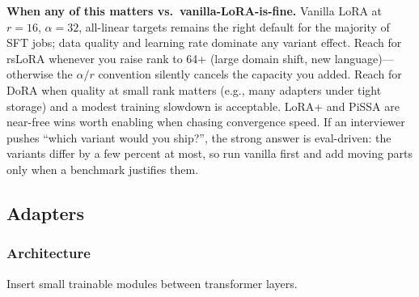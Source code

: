 \textbf{When any of this matters vs.\ vanilla-LoRA-is-fine.} Vanilla LoRA at $r = 16$, $\alpha = 32$, all-linear targets remains the right default for the majority of SFT jobs; data quality and learning rate dominate any variant effect. Reach for rsLoRA whenever you raise rank to 64+ (large domain shift, new language)---otherwise the $\alpha/r$ convention silently cancels the capacity you added. Reach for DoRA when quality at small rank matters (e.g., many adapters under tight storage) and a modest training slowdown is acceptable. LoRA+ and PiSSA are near-free wins worth enabling when chasing convergence speed. If an interviewer pushes ``which variant would you ship?'', the strong answer is eval-driven: the variants differ by a few percent at most, so run vanilla first and add moving parts only when a benchmark justifies them.

\subsection{Adapters}

\subsubsection{Architecture}

Insert small trainable modules between transformer layers.

